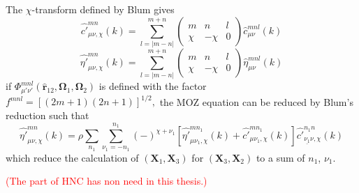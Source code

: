 The $\chi$-transform defined by Blum gives
\begin{equation}
\hat{c'}_{\mu\nu,\chi}^{mn}(k)=\sum_{l=\left|m-n\right|}^{m+n}\left(\begin{array}{ccc}
m & n & l\\
\chi & -\chi & 0
\end{array}\right)\hat{c}_{\mu\nu}^{mnl}(k)
\end{equation}
\begin{equation}
\hat{\eta'}_{\mu\nu,\chi}^{mn}(k)=\sum_{l=\left|m-n\right|}^{m+n}\left(\begin{array}{ccc}
m & n & l\\
\chi & -\chi & 0
\end{array}\right)\hat{\eta}_{\mu\nu}^{mnl}(k)
\end{equation}
if $\Phi_{\mu'\nu'}^{mnl}(\hat{\mathbf{r}}_{12},\mathbf{\Omega}_{1},\mathbf{\Omega}_{2})$
is defined with the factor $f^{mnl}=\left[(2m+1)(2n+1)\right]^{1/2},$
the \acs{MOZ} equation can be reduced by Blum's reduction such that
\begin{equation}
\hat{\eta'}_{\mu\nu,\chi}^{mn}(k)=\rho\sum_{n_{1}}\sum_{\nu_{1}=-n_{1}}^{n_{1}}(-)^{\chi+\nu_{1}}\left[\hat{\eta'}_{\mu\nu_{1},\chi}^{mn_{1}}(k)+\hat{c'}_{\mu\nu_{1},\chi}^{mn_{1}}(k)\right]\hat{c'}_{\underline{\nu_{1}}\nu,\chi}^{n_{1}n}(k)
\end{equation}
which reduce the calculation of $(\mathbf{X}_{1},\mathbf{X}_{3})$
for $(\mathbf{X}_{3},\mathbf{X}_{2})$ to a sum of $n_{1}$, $\nu_{1}$.

\textcolor{red}{(The part of HNC has non need in this thesis.)}
